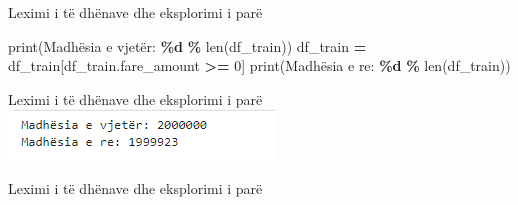 \documentclass[
  ignorenonframetext,
]{beamer}
\newenvironment{Shaded}{\begin{snugshade}}{\end{snugshade}}
\newcommand{\BuiltInTok}[1]{#1}
\newcommand{\CommentTok}[1]{\textcolor[rgb]{0.56,0.35,0.01}{\textit{#1}}}
\newcommand{\DecValTok}[1]{\textcolor[rgb]{0.00,0.00,0.81}{#1}}
\newcommand{\NormalTok}[1]{#1}
\newcommand{\OperatorTok}[1]{\textcolor[rgb]{0.81,0.36,0.00}{\textbf{#1}}}
\newcommand{\SpecialCharTok}[1]{\textcolor[rgb]{0.81,0.36,0.00}{\textbf{#1}}}
\newcommand{\StringTok}[1]{\textcolor[rgb]{0.31,0.60,0.02}{#1}}
\begin{document}
\begin{frame}[fragile]{Leximi i të dhënave dhe eksplorimi i parë}
\protect\hypertarget{leximi-i-tuxeb-dhuxebnave-dhe-eksplorimi-i-paruxeb-10}{}

\begin{Shaded}
\begin{Highlighting}[]
\BuiltInTok{print}\NormalTok{(}\StringTok{\textquotesingle{}Madhësia e vjetër: }\SpecialCharTok{\%d}\StringTok{\textquotesingle{}} \OperatorTok{\%} \BuiltInTok{len}\NormalTok{(df\_train))}
\NormalTok{df\_train }\OperatorTok{=}\NormalTok{ df\_train[df\_train.fare\_amount }\OperatorTok{\textgreater{}=} \DecValTok{0}\NormalTok{]}
\BuiltInTok{print}\NormalTok{(}\StringTok{\textquotesingle{}Madhësia e re: }\SpecialCharTok{\%d}\StringTok{\textquotesingle{}} \OperatorTok{\%} \BuiltInTok{len}\NormalTok{(df\_train))}
\end{Highlighting}
\end{Shaded}
\end{frame}

\begin{frame}{Leximi i të dhënave dhe eksplorimi i parë}
\protect\hypertarget{leximi-i-tuxeb-dhuxebnave-dhe-eksplorimi-i-paruxeb-11}{}
\includegraphics{./Figs/train3.png}
\end{frame}

\begin{frame}[fragile]{Leximi i të dhënave dhe eksplorimi i parë}
\protect\hypertarget{leximi-i-tuxeb-dhuxebnave-dhe-eksplorimi-i-paruxeb-12}{}

\begin{Shaded}
\end{Shaded}
\end{frame}
\end{document}
